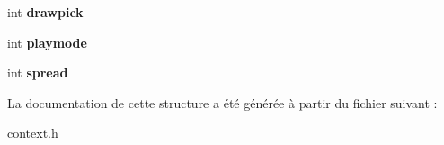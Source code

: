 \begin{DoxyCompactItemize}
\item 
\hypertarget{structcontext_a3d99a9e2fdae8652db4aa612f8d9cd96}{int {\bfseries drawpick}}\label{structcontext_a3d99a9e2fdae8652db4aa612f8d9cd96}

\item 
\hypertarget{structcontext_aa49a4684df5eedf20a5c1589e381b00e}{int {\bfseries playmode}}\label{structcontext_aa49a4684df5eedf20a5c1589e381b00e}

\item 
\hypertarget{structcontext_a9fcb2da8648b09e9271722def1ad799a}{int {\bfseries spread}}\label{structcontext_a9fcb2da8648b09e9271722def1ad799a}

\end{DoxyCompactItemize}


La documentation de cette structure a été générée à partir du fichier suivant \-:\begin{DoxyCompactItemize}
\item 
context.\-h\end{DoxyCompactItemize}
